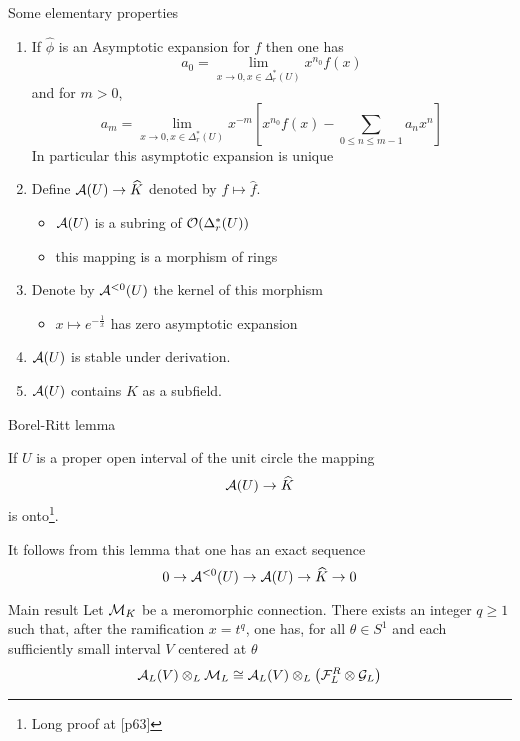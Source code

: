 \begin{frame}{Some elementary properties}
  \begin{enumerate}
    \item If $\hat\phi$ is an Asymptotic expansion for $f$ then one has
      \[
        a_0=\lim_{x\to 0,x\in\Delta_r^*(U)}x^{n_0}f(x)
      \]
      and for $m>0$,
      \[
        a_m=\lim_{x\to 0,x\in\Delta_r^*(U)}x^{-m}
          \left[x^{n_0}f(x)-\sum_{0\leq n\leq m-1}a_nx^n\right]
      \]
      In particular this asymptotic expansion is unique
    \item
      Define $\mathcal{A}(U)\to \widehat K$ denoted by $f\mapsto \hat{f}$.
      \begin{itemize}
        \item $\mathcal{A}(U)$ is a subring of $\mathcal{O}(\Delta_r^*(U))$
        \item this mapping is a morphism of rings
      \end{itemize}
    \item Denote by $\mathcal{A}^{<0}(U)$ the kernel of this morphism
      \begin{itemize}
        \item $x\mapsto e^{-\frac{1}{x}}$ has zero asymptotic expansion
      \end{itemize}
    \item $\mathcal{A}(U)$ is stable under derivation.
    \item $\mathcal{A}(U)$ contains $K$ as a subfield.
  \end{enumerate}
\end{frame}

\begin{frame}{Borel-Ritt lemma}
\begin{lemma}
If $U$ is a proper open interval of the unit circle the mapping
\[
\mathcal{A}(U)\to\widehat{K}
\]
is onto\footnote{Long proof at \cite{sabbah_cimpa90}[p63]}.
\end{lemma}

It follows from this lemma that one has an exact sequence
\[
0 \to \mathcal{A}^{<0}(U) \to \mathcal{A}(U) \to \widehat{K} \to 0
\]
\end{frame}

\begin{frame}{Main result}
Let $\mathcal{M}_K$ be a meromorphic connection. There exists an integer $q\geq 1$
such that, after the ramification $x=t^q$, one has, for all $\theta\in S^1$
and each sufficiently small interval $V$ centered at $\theta$
\[
\mathcal{A}_L(V)\otimes_L\mathcal{M}_L \cong \mathcal{A}_L(V)\otimes_L\left(\mathcal{F}_L^R\otimes\mathcal{G}_L\right)
\]
\end{frame}

\begin{frame}
\end{frame}

